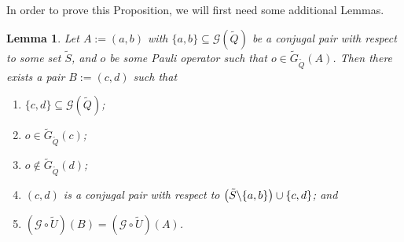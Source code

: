 \documentclass[twocolumn,showpacs,preprintnumbers,amsmath,amssymb,nofootinbib,pra,floatfix]{revtex4-1}
\newtheorem{lemma}{Lemma}
\newcommand{\set}{\tilde}
\newcommand{\genfun}{\mathcal{G}}
\begin{document}
In order to prove this Proposition, we will first need some additional Lemmas.
\begin{lemma}
\label{single-pair-rearrangement}
Let $A:=(a,b)$ with $\{a,b\}\subseteq\genfun(\set Q)$ be a conjugal pair with respect to some set $\set S$, and $o$ be some Pauli operator such that $o\in\set G_{\set Q}(A)$.  Then there exists a pair $B:=(c,d)$ such that
\begin{enumerate}
\item $\{c,d\}\subseteq\genfun(\set Q)$;
\item $o\in \set G_{\set Q}(c)$;
\item $o\notin \set G_{\set Q}(d)$;
\item $(c,d)$ is a conjugal pair with respect to $\paren{\set S\backslash \{a,b\}}\cup\{c,d\}$; and
\item $(\genfun\circ\set U)(B) = (\genfun\circ\set U)(A)$.
\end{enumerate}
\end{lemma}
\end{document}
